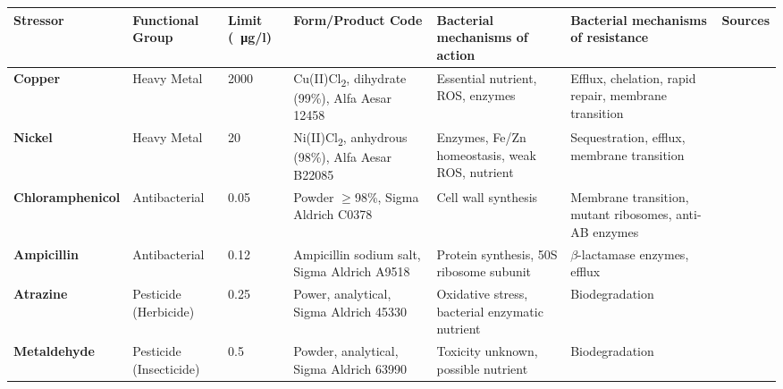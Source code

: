 \documentclass[final,1p,times]{elsarticle}
\begin{document}

\begin{landscape}
\begin{table}[ht]
\begin{threeparttable}
\small
\setlength{\tabcolsep}{4pt}
\setlength{\extrarowheight}{3pt}
\begin{tabular}{l M l M L L c}
\toprule
\textbf{Stressor} & \textbf{Functional Group} & \textbf{Limit (\SI{}{\ug}/l}) & \textbf{Form/Product Code} & \textbf{Bacterial mechanisms of action} & \textbf{Bacterial mechanisms of resistance} & \textbf{Sources} \\
\midrule
{}\textbf{Copper} & Heavy Metal & 2000 & Cu(II)Cl\textsubscript{2}, dihydrate (99\%), Alfa Aesar 12458 & Essential nutrient, ROS, enzymes & Efflux, chelation, rapid repair, membrane transition & \cite{Nayar2004EnvironmentalMesocosms,Valko2005MetalsStress,Dupont2011CopperApplications,ECHA2018REACHCopper} \\
\textbf{Nickel} & Heavy Metal & 20 & Ni(II)Cl\textsubscript{2}, anhydrous (98\%), Alfa Aesar B22085 & Enzymes, Fe/Zn homeostasis, weak ROS, nutrient & Sequestration, efflux, membrane transition & \cite{Nayar2004EnvironmentalMesocosms,Macomber2011,Nishimura1998ProtonCerevisiae,Zamble2015NickelBiology} \\
\textbf{Chloramphenicol} & Antibacterial & 0.05 & Powder $\geqslant$98\%, Sigma Aldrich C0378 & Cell wall synthesis & Membrane transition, mutant ribosomes, anti-AB enzymes & \cite{Shaw1979Primary31,Rebstock1949ChloramphenicolChloromycetin,Toku-E2018ChloramphenicolChloromycetin,Ruiz1999MechanismsFish} \\
\textbf{Ampicillin} & Antibacterial & 0.12 & Ampicillin sodium salt, Sigma Aldrich A9518 & Protein synthesis, 50S ribosome subunit & $\beta$-lactamase enzymes, efflux & \cite{Ruiz1999MechanismsFish,Costanzo2005EcosystemEnvironment} \\
\textbf{Atrazine} & Pesticide (Herbicide) & 0.25 & Power, analytical, Sigma Aldrich 45330 & Oxidative stress, bacterial enzymatic nutrient & Biodegradation & \cite{Shimabukuro1969AtrazineAction,Delorenzo2001TOXICITYREVIEW,Zhang2012OxidativeAtrazine} \\
\textbf{Metaldehyde} & Pesticide \break (Insecticide) & 0.5 & Powder, analytical, Sigma Aldrich 63990 & Toxicity unknown, possible nutrient & Biodegradation & \cite{Kay2014UsingProblem,Castle2017,Thomas2017IsolationSoils} \\

\end{tabular}
\end{threeparttable}
\end{table}
\end{landscape}
\end{document}
